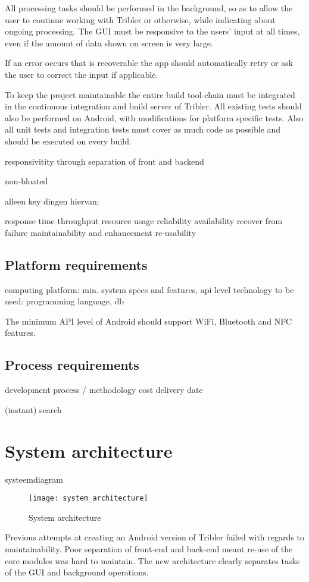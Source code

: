 All processing tasks should be performed in the background, so as to allow the user to continue working with Tribler or otherwise, while indicating about ongoing processing.
The GUI must be responsive to the users' input at all times, even if the amount of data shown on screen is very large.

If an error occurs that is recoverable the app should automatically retry or ask the user to correct the input if applicable.

To keep the project maintainable the entire build tool-chain must be integrated in the continuous integration and build server of Tribler.
All existing tests should also be performed on Android, with modifications for platform specific tests.
Also all unit tests and integration tests must cover as much code as possible and should be executed on every build.


responsivitity through separation of front and backend


non-bloated

alleen key dingen hiervan:

response time
throughput
resource usage
reliability
availability
recover from failure
maintainability and enhancement
re-usability

\subsection{Platform requirements}

computing platform: min. system specs and features, api level
technology to be used: programming language, db

The minimum API level of Android should support WiFi, Bluetooth and NFC features.



\subsection{Process requirements}

development process / methodology
cost
delivery date




(instant) search





\section{System architecture}

systeemdiagram

\begin{figure}[h]
	\centering
	\texttt{[image: system\_architecture]}
	\caption{System architecture}
	\label{fig:system_architecture}
\end{figure}


Previous attempts at creating an Android version of Tribler failed with regards to maintainability.
Poor separation of front-end and back-end meant re-use of the core modules was hard to maintain.
The new architecture clearly separates tasks of the GUI and background operations.


